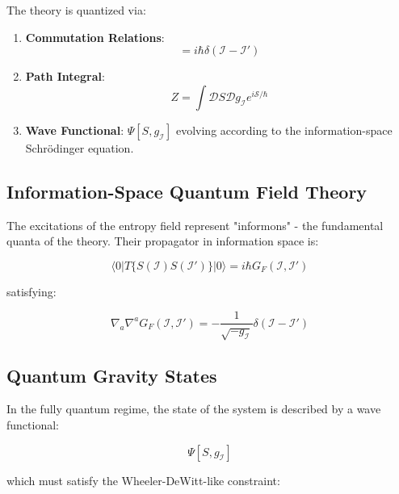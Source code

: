 \documentclass{article}
\begin{document}
The theory is quantized via:

\begin{enumerate}
\item \textbf{Commutation Relations}:
   \begin{equation}
   [S(\mathcal{I}), \Pi_S(\mathcal{I}')] = i\hbar \delta(\mathcal{I} - \mathcal{I}')
   \end{equation}

\item \textbf{Path Integral}:
   \begin{equation}
   Z = \int \mathcal{D}S \mathcal{D}g_\mathcal{I} e^{i\mathcal{S}/\hbar}
   \end{equation}

\item \textbf{Wave Functional}:
   $\Psi[S, g_\mathcal{I}]$
   evolving according to the information-space Schrödinger equation.
\end{enumerate}

\subsection{Information-Space Quantum Field Theory}

The excitations of the entropy field represent "informons" - the fundamental quanta of the theory. Their propagator in information space is:

\begin{equation}
\langle 0 |T\{S(\mathcal{I})S(\mathcal{I}')\}| 0 \rangle = i\hbar G_F(\mathcal{I},\mathcal{I}')
\end{equation}

satisfying:

\begin{equation}
\nabla_a\nabla^a G_F(\mathcal{I},\mathcal{I}') = -\frac{1}{\sqrt{-g_\mathcal{I}}}\delta(\mathcal{I} - \mathcal{I}')
\end{equation}

\subsection{Quantum Gravity States}

In the fully quantum regime, the state of the system is described by a wave functional:

\begin{equation}
\Psi[S, g_\mathcal{I}]
\end{equation}

which must satisfy the Wheeler-DeWitt-like constraint:
\end{document}
